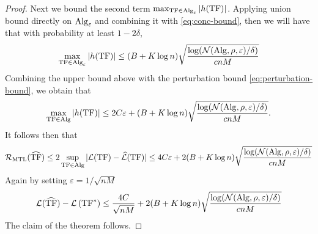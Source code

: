 \begin{proof}
Next we bound the second term $\max _{\mathrm{TF} \in \mathrm{Alg}_{\varepsilon}}|h(\mathrm{TF})|$. Applying union bound directly on $\mathrm{Alg}_{\varepsilon}$ and combining it with \eqref{eq:conc-bound}, then we will have that with probability at least $1-2 \delta$,
\begin{align*}
    \max _{\mathrm{TF} \in \mathrm{Alg}_{\varepsilon}}|h(\mathrm{TF})| \leq(B+K \log n) \sqrt{\frac{\log (\mathcal{N}(\mathrm{Alg}, \rho, \varepsilon) / \delta)}{c n M}}
\end{align*}
Combining the upper bound above with the perturbation bound \eqref{eq:perturbation-bound}, we obtain that
\begin{align*}
    \max _{\mathrm{TF} \in \mathrm{Alg}}|h(\mathrm{TF})| \leq 2 C \varepsilon+(B+K \log n) \sqrt{\frac{\log (\mathcal{N}(\mathrm{Alg}, \rho, \varepsilon) / \delta)}{c n M}}.
\end{align*}
It follows then that
\begin{align*}
    \mathcal{R}_{\mathrm{MTL}}(\widehat{\mathrm{TF}}) \leq 2 \sup _{\mathrm{TF} \in \mathrm{Alg}}|\mathcal{L}(\mathrm{TF})-\widehat{\mathcal{L}}(\mathrm{TF})| \leq 4 C \varepsilon+ 2(B+K \log n) \sqrt{\frac{\log (\mathcal{N}(\mathrm{Alg}, \rho, \varepsilon) / \delta)}{c n M}}
\end{align*}
Again by setting $\varepsilon = 1/\sqrt{n M}$
\begin{align*}
    \mathcal{L}(\widehat{\mathrm{TF}})-\mathcal{L}\left(\mathrm{TF}^*\right)\leq \dfrac{4 C}{\sqrt{n M}}+2(B+K \log n) \sqrt{\frac{\log (\mathcal{N}(\mathrm{Alg}, \rho, \varepsilon) / \delta)}{c n M}}
\end{align*}
The claim of the theorem follows.
\end{proof}




